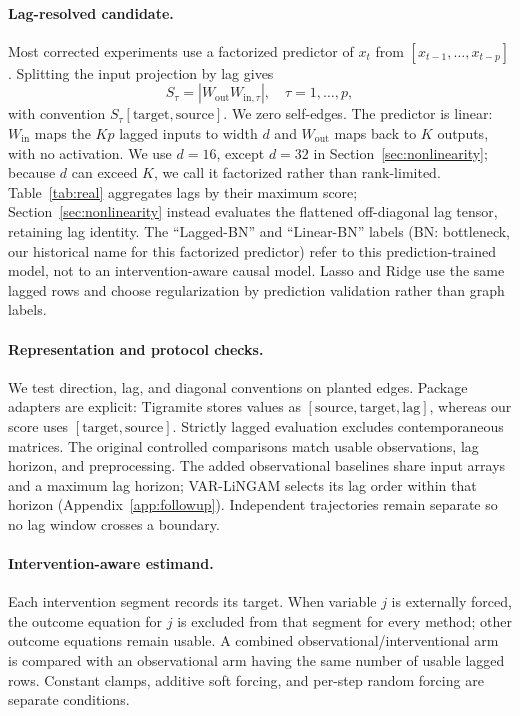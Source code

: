 \paragraph{Lag-resolved candidate.}
Most corrected experiments use a factorized predictor of $x_t$ from
$[x_{t-1},\ldots,x_{t-p}]$. Splitting the input projection by lag gives
\[
  S_\tau=\left|W_{\mathrm{out}}W_{\mathrm{in},\tau}\right|,
  \quad \tau=1,\ldots,p,
\]
with convention $S_\tau[\mathrm{target},\mathrm{source}]$. We zero
self-edges. The predictor is linear: $W_{\mathrm{in}}$ maps the $Kp$ lagged
inputs to width $d$ and $W_{\mathrm{out}}$ maps back to $K$ outputs, with no
activation. We use $d=16$, except $d=32$ in Section~\ref{sec:nonlinearity};
because $d$ can exceed $K$, we call it factorized rather than rank-limited.
Table~\ref{tab:real} aggregates lags by their maximum score;
Section~\ref{sec:nonlinearity} instead evaluates the flattened off-diagonal
lag tensor, retaining lag identity. The ``Lagged-BN'' and ``Linear-BN'' labels (BN: bottleneck, our historical
name for this factorized predictor) refer to this prediction-trained model,
not to an intervention-aware causal model. Lasso and Ridge use the same lagged
rows and choose regularization by prediction validation rather than graph
labels.

\paragraph{Representation and protocol checks.}
We test direction, lag, and diagonal conventions on planted edges. Package
adapters are explicit: Tigramite stores values as
$[\mathrm{source},\mathrm{target},\mathrm{lag}]$, whereas our score uses
$[\mathrm{target},\mathrm{source}]$. Strictly lagged evaluation excludes
contemporaneous matrices. The original controlled comparisons match usable
observations, lag horizon, and preprocessing. The added observational baselines
share input arrays and a maximum lag horizon; VAR-LiNGAM selects its lag order
within that horizon (Appendix~\ref{app:followup}). Independent trajectories remain
separate so no lag window crosses a boundary.

\paragraph{Intervention-aware estimand.}
Each intervention segment records its target. When variable $j$ is externally
forced, the outcome equation for $j$ is excluded from that segment for every
method; other outcome equations remain usable. A combined
observational/interventional arm is compared with an observational arm having
the same number of usable lagged rows. Constant clamps, additive soft forcing,
and per-step random forcing are separate conditions.

